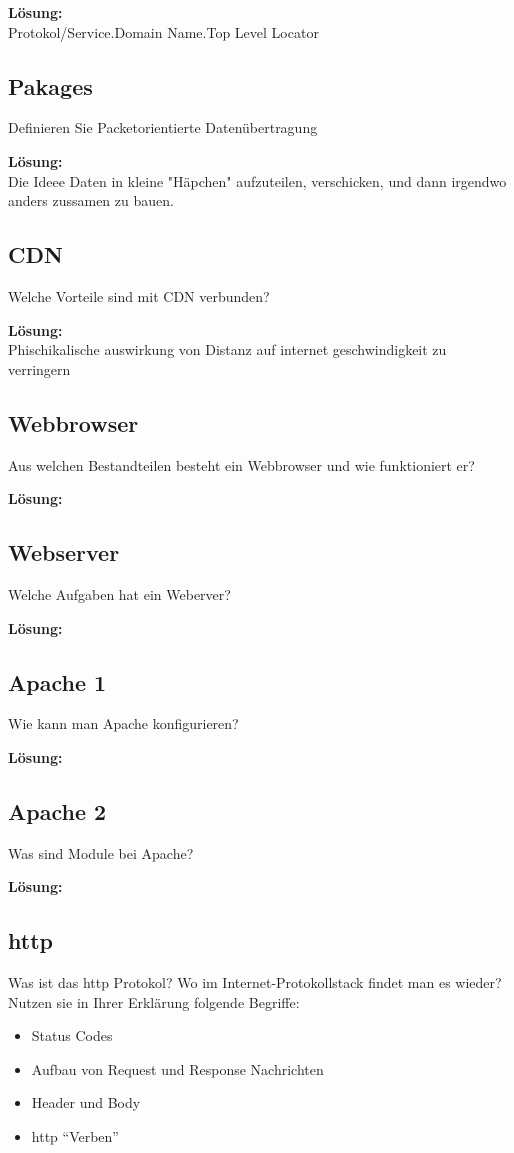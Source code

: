 \documentclass[11pt,a4paper,DIV=12]{scrartcl}
\newcommand{\loesung}{\textbf{Lösung:}\\}
\begin{document}
\loesung
{Protokol/Service}.{Domain Name}.{Top Level Locator}
\subsection{Pakages}
Definieren Sie Packetorientierte Datenübertragung

\loesung
Die Ideee Daten in kleine "Häpchen" aufzuteilen, verschicken, und dann irgendwo anders zussamen zu bauen.
\subsection{CDN}
Welche Vorteile sind mit CDN verbunden?

\loesung
Phischikalische auswirkung von Distanz auf internet geschwindigkeit zu verringern
\subsection{Webbrowser}
Aus welchen Bestandteilen besteht ein Webbrowser und wie funktioniert er?

\loesung

\subsection{Webserver}
Welche Aufgaben hat ein Weberver?

\loesung

\subsection{Apache 1}
Wie kann man Apache konfigurieren?

\loesung

\subsection{Apache 2}
Was sind Module bei Apache?

\loesung

\subsection{http}
Was ist das http Protokol? Wo im Internet-Protokollstack findet man es wieder? Nutzen sie in Ihrer Erklärung folgende Begriffe:
\begin{itemize}
    \item Status Codes 
    \item Aufbau von Request und Response Nachrichten
    \item Header und Body
    \item http \enquote{Verben}
\end{itemize}
\end{document}
